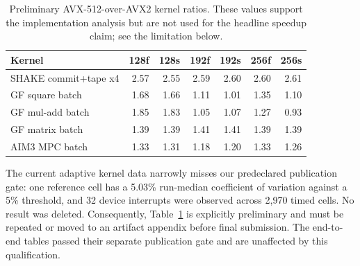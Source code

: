 \begin{table}[t]
\centering
\caption{Preliminary AVX-512-over-AVX2 kernel ratios.  These values support the
implementation analysis but are not used for the headline speedup claim; see
the limitation below.}
\label{tab:kernels}
\scriptsize
\setlength{\tabcolsep}{4pt}
\begin{tabular}{lrrrrrr}
\toprule
Kernel & 128f & 128s & 192f & 192s & 256f & 256s\\
\midrule
SHAKE commit+tape x4 & 2.57 & 2.55 & 2.59 & 2.60 & 2.60 & 2.61\\
GF square batch       & 1.68 & 1.66 & 1.11 & 1.01 & 1.35 & 1.10\\
GF mul-add batch      & 1.85 & 1.83 & 1.05 & 1.07 & 1.27 & 0.93\\
GF matrix batch       & 1.39 & 1.39 & 1.41 & 1.41 & 1.39 & 1.39\\
AIM3 MPC batch        & 1.33 & 1.31 & 1.18 & 1.20 & 1.33 & 1.26\\
\bottomrule
\end{tabular}
\end{table}

The current adaptive kernel data narrowly misses our predeclared publication
gate: one reference cell has a 5.03\% run-median coefficient of variation
against a 5\% threshold, and 32 device interrupts were observed across 2,970
timed cells.  No result was deleted.  Consequently, Table~\ref{tab:kernels} is
explicitly preliminary and must be repeated or moved to an artifact appendix
before final submission.  The end-to-end tables passed their separate
publication gate and are unaffected by this qualification.
